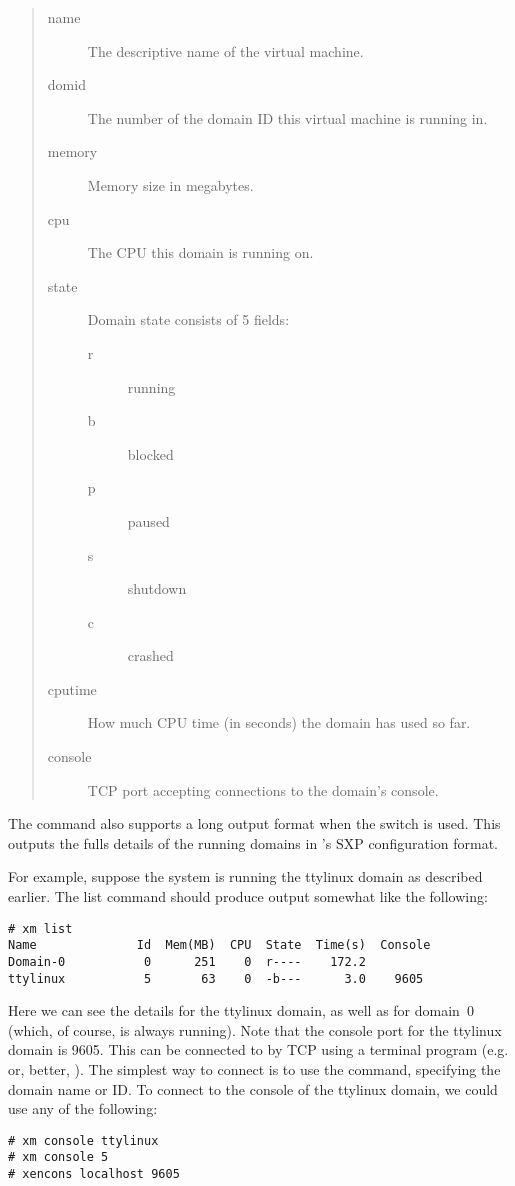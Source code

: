 \begin{quote}
  \begin{description}
  \item[name] The descriptive name of the virtual machine.
  \item[domid] The number of the domain ID this virtual machine is
    running in.
  \item[memory] Memory size in megabytes.
  \item[cpu] The CPU this domain is running on.
  \item[state] Domain state consists of 5 fields:
    \begin{description}
    \item[r] running
    \item[b] blocked
    \item[p] paused
    \item[s] shutdown
    \item[c] crashed
    \end{description}
  \item[cputime] How much CPU time (in seconds) the domain has used so
    far.
  \item[console] TCP port accepting connections to the domain's
    console.
  \end{description}
\end{quote}

The  command also supports a long output format when the
 switch is used.  This outputs the fulls details of the
running domains in \xend's SXP configuration format.

For example, suppose the system is running the ttylinux domain as
described earlier.  The list command should produce output somewhat
like the following:
\begin{verbatim}
# xm list
Name              Id  Mem(MB)  CPU  State  Time(s)  Console
Domain-0           0      251    0  r----    172.2        
ttylinux           5       63    0  -b---      3.0    9605
\end{verbatim}

Here we can see the details for the ttylinux domain, as well as for
domain~0 (which, of course, is always running).  Note that the console
port for the ttylinux domain is 9605.  This can be connected to by TCP
using a terminal program (e.g.  or, better,
).  The simplest way to connect is to use the
 command, specifying the domain name or ID.  To
connect to the console of the ttylinux domain, we could use any of the
following:
\begin{verbatim}
# xm console ttylinux
# xm console 5
# xencons localhost 9605
\end{verbatim}

